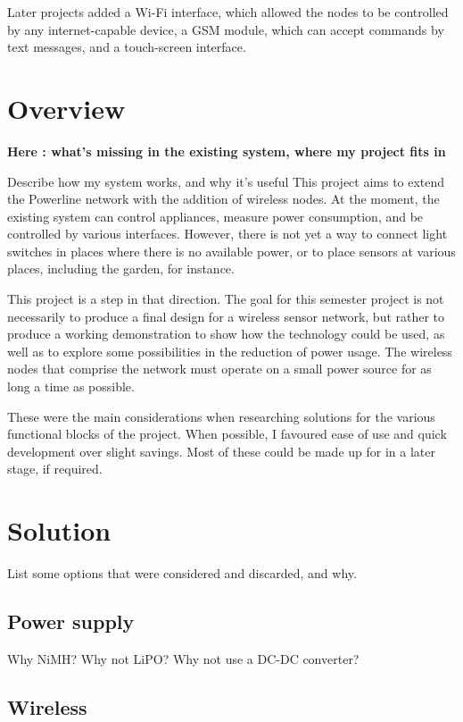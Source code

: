 Later projects added a Wi-Fi interface, which allowed the nodes to be controlled
by any internet-capable device, a GSM module, which can accept commands by text
messages, and a touch-screen interface.


\section{Overview}
\textbf{Here : what's missing in the existing system, where my project fits in}

Describe how my system works, and why it's useful
This project aims to extend the Powerline network with the addition of wireless
nodes. At the moment, the existing system can control appliances, measure power
consumption, and be controlled by various interfaces. However, there is not yet
a way to connect light switches in places where there is no available power, or
to place sensors at various places, including the garden, for instance.

This project is a step in that direction. The goal for this semester project is
not necessarily to produce a final design for a wireless sensor network, but
rather to produce a working demonstration to show how the technology could be
used, as well as to explore some possibilities in the reduction of power usage.
The wireless nodes that comprise the network must operate on a small power
source for as long a time as possible.

These were the main considerations when researching solutions for the various
functional blocks of the project. When possible, I favoured ease of use and
quick development over slight savings. Most of these could be made up for in a
later stage, if required.

\section{Solution}
List some options that were considered and discarded, and why.

\subsection{Power supply}
Why NiMH? Why not LiPO? Why not use a DC-DC converter?


\subsection{Wireless}
